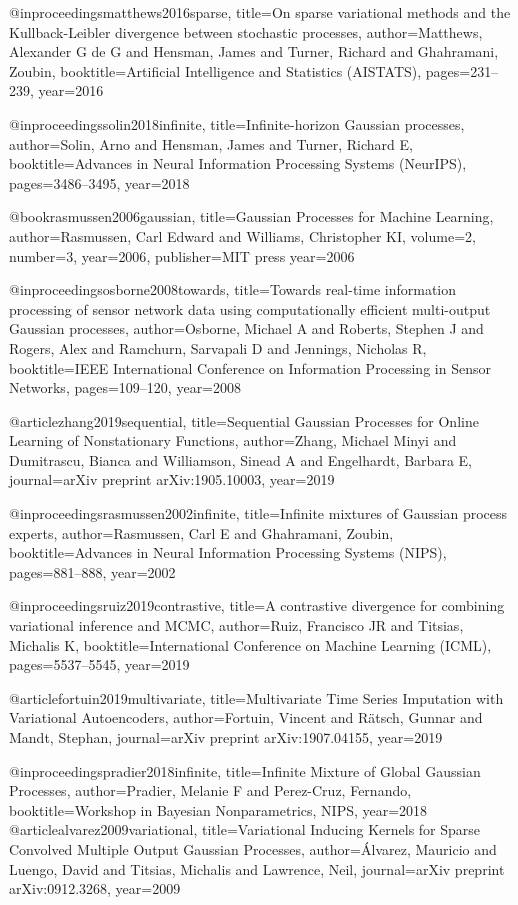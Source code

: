 \documentclass[]{article}
\begin{document}
@inproceedings{matthews2016sparse,
	title={On sparse variational methods and the {K}ullback-{L}eibler divergence between stochastic processes},
	author={Matthews, Alexander G de G and Hensman, James and Turner, Richard and Ghahramani, Zoubin},
	booktitle={Artificial Intelligence and Statistics (AISTATS)},
	pages={231--239},
	year={2016}
}

@inproceedings{solin2018infinite,
	title={Infinite-horizon {G}aussian processes},
	author={Solin, Arno and Hensman, James and Turner, Richard E},
	booktitle={Advances in Neural Information Processing Systems (NeurIPS)},
	pages={3486--3495},
	year={2018}
}

@book{rasmussen2006gaussian,
	title={Gaussian Processes for Machine Learning},
	author={Rasmussen, Carl Edward and Williams, Christopher KI},
	volume={2},
	number={3},
	year={2006},
	publisher={MIT press}
	year={2006}
}

@inproceedings{osborne2008towards,
	title={Towards real-time information processing of sensor network data using computationally efficient multi-output {G}aussian processes},
	author={Osborne, Michael A and Roberts, Stephen J and Rogers, Alex and Ramchurn, Sarvapali D and Jennings, Nicholas R},
	booktitle={IEEE International Conference on Information Processing in Sensor Networks},
	pages={109--120},
	year={2008}
}

@article{zhang2019sequential,
	title={Sequential {G}aussian Processes for Online Learning of Nonstationary Functions},
	author={Zhang, Michael Minyi and Dumitrascu, Bianca and Williamson, Sinead A and Engelhardt, Barbara E},
	journal={arXiv preprint arXiv:1905.10003},
	year={2019}
}

@inproceedings{rasmussen2002infinite,
	title={Infinite mixtures of {G}aussian process experts},
	author={Rasmussen, Carl E and Ghahramani, Zoubin},
	booktitle={Advances in Neural Information Processing Systems (NIPS)},
	pages={881--888},
	year={2002}
}

@inproceedings{ruiz2019contrastive,
	title={A contrastive divergence for combining variational inference and {MCMC}},
	author={Ruiz, Francisco JR and Titsias, Michalis K},
	booktitle={International Conference on Machine Learning (ICML)},
	pages={5537--5545},
	year={2019}
}

@article{fortuin2019multivariate,
	title={Multivariate Time Series Imputation with Variational Autoencoders},
	author={Fortuin, Vincent and R{\"a}tsch, Gunnar and Mandt, Stephan},
	journal={arXiv preprint arXiv:1907.04155},
	year={2019}
}

@inproceedings{pradier2018infinite,
	title={Infinite Mixture of Global {G}aussian Processes},
	author={Pradier, Melanie F and Perez-Cruz, Fernando},
	booktitle={Workshop in Bayesian Nonparametrics, NIPS},
	year={2018}
}
@article{alvarez2009variational,
	title={Variational Inducing Kernels for Sparse Convolved Multiple Output {G}aussian Processes},
	author={{\'A}lvarez, Mauricio and Luengo, David and Titsias, Michalis and Lawrence, Neil},
	journal={arXiv preprint arXiv:0912.3268},
	year={2009}
} 
\end{document}
